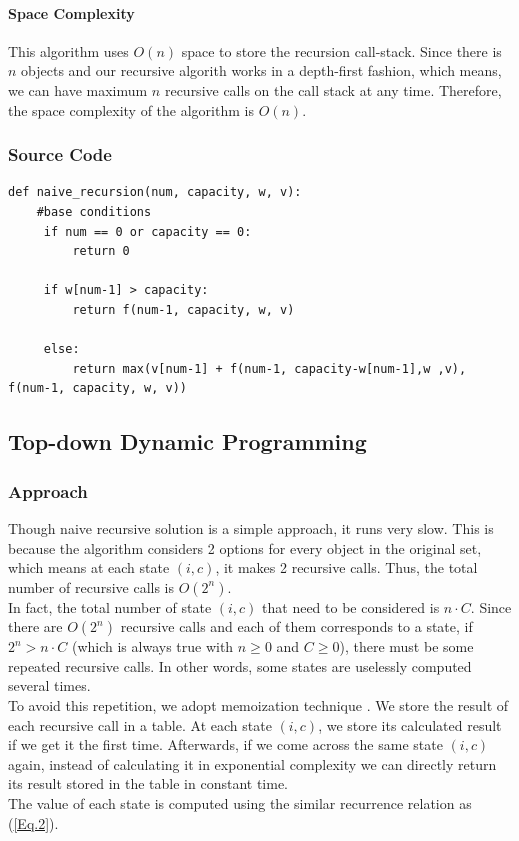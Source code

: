 \documentclass{article}
\begin{document}
\paragraph{Space Complexity} 
This algorithm uses $O(n)$ space to store the recursion call-stack. Since there is $n$ objects and our recursive algorith works in a depth-first fashion, which means, we can have maximum $n$ recursive calls on the call stack at any time. Therefore, the space complexity of the algorithm is $O(n)$.

\subsubsection{Source Code}
\begin{lstlisting}[breaklines=true]
def naive_recursion(num, capacity, w, v):
    #base conditions
     if num == 0 or capacity == 0: 
         return 0
    
     if w[num-1] > capacity:
         return f(num-1, capacity, w, v)

     else:
         return max(v[num-1] + f(num-1, capacity-w[num-1],w ,v), f(num-1, capacity, w, v))
\end{lstlisting}

\subsection{Top-down Dynamic Programming}
\subsubsection{Approach}
Though naive recursive solution is a simple approach, it runs very slow. This is because the algorithm considers 2 options for every object in the original set, which means at each state $(i, c)$, it makes 2 recursive calls. Thus, the total number of recursive calls is $O(2^n)$. \\
\indent In fact, the total number of state $(i,c)$ that need to be considered is $n \cdot C$. Since there are $O(2^n)$ recursive calls and each of them corresponds to a state, if $2^n > n \cdot C$ (which is always true with $n \geq 0$ and $C \geq 0$), there must be some repeated recursive calls. In other words, some states are uselessly computed several times. \\
\indent To avoid this repetition, we adopt memoization technique \cite{memo}. We store the result of each recursive call in a table. At each state $(i,c)$, we store its calculated result if we get it the first time. Afterwards, if we come across the same state $(i,c)$ again, instead of calculating it in exponential complexity we can directly return its result stored in the table in constant time. \\
\indent The value of each state is computed using the similar recurrence relation as (\ref{Eq.2}).
\end{document}
